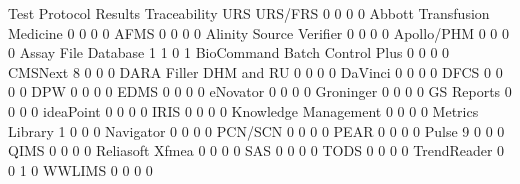 \documentclass{article}
\begin{document}
\begin{Schunk}
\begin{Soutput}
                                Test Protocol Results Traceability URS URS/FRS
                                                    0            0   0       0
  Abbott Transfusion Medicine                       0            0   0       0
  AFMS                                              0            0   0       0
  Alinity Source Verifier                           0            0   0       0
  Apollo/PHM                                        0            0   0       0
  Assay File Database                               1            1   0       1
  BioCommand Batch Control Plus                     0            0   0       0
  CMSNext                                           8            0   0       0
  DARA Filler DHM and RU                            0            0   0       0
  DaVinci                                           0            0   0       0
  DFCS                                              0            0   0       0
  DPW                                               0            0   0       0
  EDMS                                              0            0   0       0
  eNovator                                          0            0   0       0
  Groninger                                         0            0   0       0
  GS Reports                                        0            0   0       0
  ideaPoint                                         0            0   0       0
  IRIS                                              0            0   0       0
  Knowledge Management                              0            0   0       0
  Metrics Library                                   1            0   0       0
  Navigator                                         0            0   0       0
  PCN/SCN                                           0            0   0       0
  PEAR                                              0            0   0       0
  Pulse                                             9            0   0       0
  QIMS                                              0            0   0       0
  Reliasoft Xfmea                                   0            0   0       0
  SAS                                               0            0   0       0
  TODS                                              0            0   0       0
  TrendReader                                       0            0   1       0
  WWLIMS                                            0            0   0       0
                               

\end{Soutput}
\end{Schunk}
\end{document}
